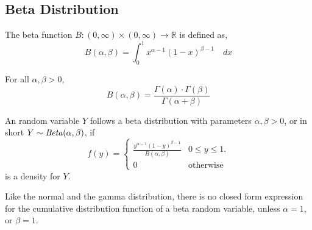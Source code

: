 \subsection{Beta Distribution}
\begin{definition}
The beta function $B : (0, \infty) \times (0, \infty) \rightarrow \mathbb{R}$
is defined as,
\[
    B(\alpha, \beta) = \int_{0}^{1} 
                           x^{\alpha - 1}(1 - x)^{\beta - 1}
                       \quad dx
\]
\end{definition}

\begin{theorem}
For all $\alpha, \beta > 0$,
\[
    B(\alpha, \beta) = \frac 
                           {\Gamma(\alpha) \cdot \Gamma(\beta)}
                           {\Gamma(\alpha + \beta)}
\]
\end{theorem}

\begin{definition}
An random variable $Y$ follows a beta distribution with parameters $\alpha,
\beta > 0$, or in short $Y \sim \text{\emph{Beta}}(\alpha, \beta)$, if 
\[
    f(y) = \begin{cases}
        \frac {y^{\alpha - 1} (1 - y)^{\beta - 1}}
              {B(\alpha, \beta)}                     & 0 \leq y \leq 1.      \\
        0                                            & \text{otherwise}
    \end{cases}
\]
is a density for $Y$. 
\end{definition}
Like the normal and the gamma distribution, there is no closed form expression
for the cumulative distribution function of a beta random variable, unless
$\alpha = 1$, or $\beta = 1$.

